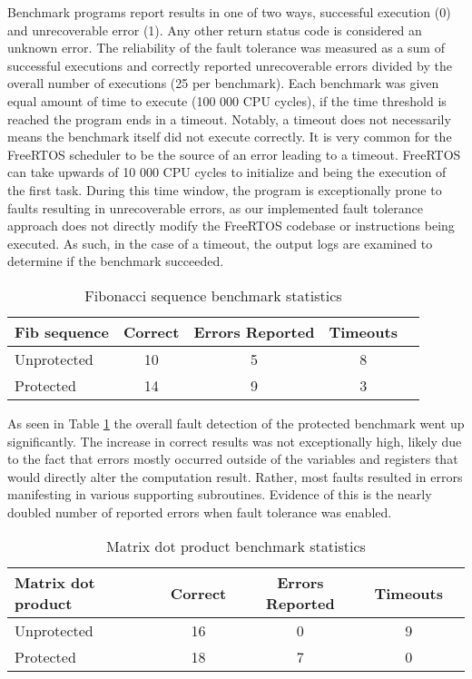Benchmark programs report results in one of two ways, successful execution (0) and unrecoverable error (1). Any other return status code is considered an unknown error. The reliability of the fault tolerance was measured as a sum of successful executions and correctly reported unrecoverable errors divided by the overall number of executions (25 per benchmark). Each benchmark was given equal amount of time to execute (100 000 CPU cycles), if the time threshold is reached the program ends in a timeout. Notably, a timeout does not necessarily means the benchmark itself did not execute correctly. It is very common for the FreeRTOS scheduler to be the source of an error leading to a timeout. FreeRTOS can take upwards of 10 000 CPU cycles to initialize and being the execution of the first task. During this time window, the program is exceptionally prone to faults resulting in unrecoverable errors, as our implemented fault tolerance approach does not directly modify the FreeRTOS codebase or instructions being executed. As such, in the case of a timeout, the output logs are examined to determine if the benchmark succeeded.

\begin{table}[h]
\centering
\begin{tabular}{|l|c|c|c|c|}
\hline
\textbf{Fib sequence} & \textbf{Correct} & \textbf{Errors Reported} & \textbf{Timeouts} \\
\hline
Unprotected & 10 & 5 & 8 \\
Protected & 14 & 9 & 3 \\
\hline
\end{tabular}
\caption{Fibonacci sequence benchmark statistics}
\label{tab:fib_bench}
\end{table}

As seen in Table \ref{tab:fib_bench} the overall fault detection of the protected benchmark went up significantly. The increase in correct results was not exceptionally high, likely due to the fact that errors mostly occurred outside of the variables and registers that would directly alter the computation result. Rather, most faults resulted in errors manifesting in various supporting subroutines. Evidence of this is the nearly doubled number of reported errors when fault tolerance was enabled.

\begin{table}[h]
\centering
\begin{tabular}{|l|c|c|c|c|}
\hline
\textbf{Matrix dot product} & \textbf{Correct} & \textbf{Errors Reported} & \textbf{Timeouts} \\
\hline
Unprotected & 16 & 0 & 9 \\
Protected & 18 & 7 & 0 \\
\hline
\end{tabular}
\caption{Matrix dot product benchmark statistics}
\label{tab:matrix_bench}
\end{table}

